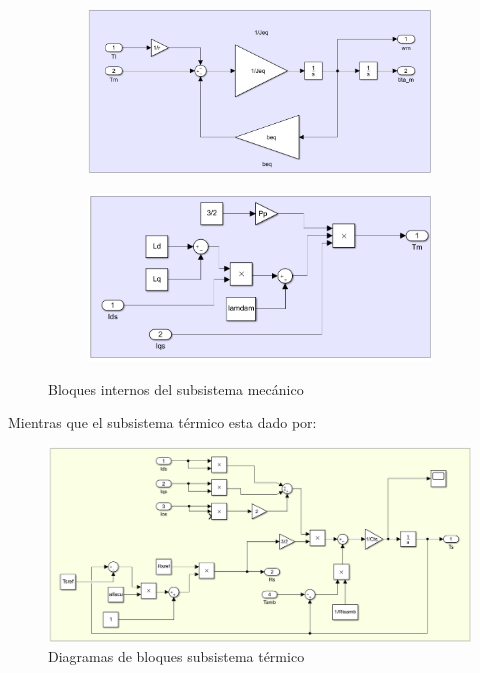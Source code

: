 \documentclass{article}
\begin{document}
\begin{figure}[H]
    \begin{subfigure}[b]{0.5\textwidth}
        \centering
        \includegraphics[width=1\textwidth]{sub_mecanico2.png}
    \end{subfigure}
    \begin{subfigure}[b]{0.5\textwidth}
        \centering
        \includegraphics[width=1\textwidth]{sub_mecanico3.png}
    \end{subfigure}
    \caption{Bloques internos del subsistema mecánico}
\end{figure}

Mientras que el subsistema térmico esta dado por:

\begin{figure}[H]
    \centering
    \includegraphics[width=1\textwidth]{sub_termico.png}
    \caption{Diagramas de bloques subsistema térmico}
\end{figure}
\end{document}
